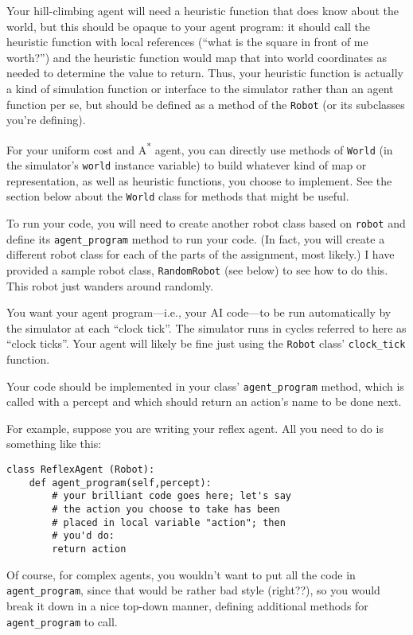 \documentclass[11pt]{tufte-handout}
\begin{document}
Your hill-climbing agent will need a heuristic function that does know about the world, but this should be opaque to your agent program: it should call the heuristic function with local references (``what is the square in front of me worth?'') and the heuristic function would map that into world coordinates as needed to determine the value to return.  Thus, your heuristic function is actually a kind of simulation function or interface to the simulator rather than an agent function per se, but should be defined as a method of the \texttt{Robot} (or its subclasses you're defining).

For your uniform cost and A\textsuperscript{*} agent, you can directly use methods of \texttt{World} (in the simulator's \texttt{world} instance variable) to build whatever kind of map or representation, as well as heuristic functions, you choose to implement.  See the section below about the \texttt{World} class for methods that might be useful.

To run your code, you will need to create another robot class based on \texttt{robot} and define its \texttt{agent\_program} method to run your code.  (In fact, you will create a different robot class for each of the parts of the assignment, most likely.)  I have provided a sample robot class, \texttt{RandomRobot} (see below) to see how to do this.  This robot just wanders around randomly.

You want your agent program---i.e., your AI code---to be run automatically by the simulator at each ``clock tick''.  The simulator runs in cycles referred to here as ``clock ticks''.  Your agent will likely be fine just using the \texttt{Robot} class' \texttt{clock\_tick} function.  

Your code should be implemented in your class' \texttt{agent\_program} method, which is called with a percept and which should return an action's name to be done next.

For example, suppose you are writing your reflex agent.  All you need to do is something like this:
\begin{verbatim}
class ReflexAgent (Robot):
    def agent_program(self,percept):
        # your brilliant code goes here; let's say
        # the action you choose to take has been
        # placed in local variable "action"; then
        # you'd do:
        return action
\end{verbatim}

Of course, for complex agents, you wouldn't want to put all the code in \texttt{agent\_program}, since that would be rather bad style (right??), so you would break it down in a nice top-down manner, defining additional methods for \texttt{agent\_program} to call.
\end{document}
